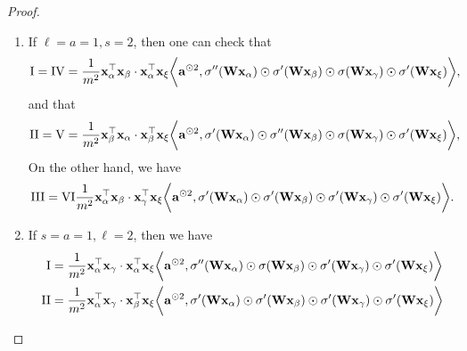 \begin{proof}
\begin{enumerate}[itemsep=0mm]
\begin{align*}
		\end{align*}
		Meanwhile, we have
		\begin{align*}
			\RN{2} & = (\nabla^2 f_\alpha)^{1jk}_{1uv} (\nabla^2 f_\beta)^{1jk}_{21 c} (\nabla f_\gamma)_{1uv} (\nabla f_\xi)_{21c} \\
			& = \frac{1}{m^2}\rvx_\alpha^\top\rvx_\beta \cdot\rvx_\alpha^\top\rvx_\gamma \bigg\la\rva^{\odot 2} , \sigma''(\rmW \rvx_\alpha) \odot \sigma'(\rmW \rvx_\beta) \odot \sigma'(\rmW \rvx_\gamma) \odot \sigma(\rmW \rvx_\xi) \bigg\ra \\
			& = \RN{1}.
		\end{align*}
		A similar calculation shows that $\RN{3} = \RN{2} = \RN{1}$. On the other hand, it's easy to check that
		\[
			\RN{4} = \RN{5} = \RN{6} = 
			\frac{1}{m^2}\rvx_\beta^\top\rvx_\alpha \cdot\rvx_\beta^\top\rvx_\gamma \bigg\la\rva^{\odot 2} , \sigma'(\rmW \rvx_\alpha) \odot \sigma''(\rmW \rvx_\beta) \odot \sigma'(\rmW \rvx_\gamma) \odot \sigma(\rmW \rvx_\xi) \bigg\ra.
		\]
		\item If $\ell = a = 1, s = 2$, then one can check that
		\[
			\RN{1} = \RN{4} = 
			\frac{1}{m^2}\rvx_\alpha^\top\rvx_\beta \cdot\rvx_\alpha^\top\rvx_\xi \bigg\la\rva^{\odot 2} , \sigma''(\rmW \rvx_\alpha) \odot \sigma'(\rmW \rvx_\beta) \odot \sigma(\rmW \rvx_\gamma) \odot \sigma'(\rmW \rvx_\xi) \bigg\ra,
		\]
		and that
		\[
			\RN{2} = \RN{5} = 
			\frac{1}{m^2}\rvx_\beta^\top\rvx_\alpha \cdot\rvx_\beta^\top\rvx_\xi \bigg\la\rva^{\odot 2} , \sigma'(\rmW \rvx_\alpha) \odot \sigma''(\rmW \rvx_\beta) \odot \sigma(\rmW \rvx_\gamma) \odot \sigma'(\rmW \rvx_\xi) \bigg\ra,
		\]
		On the other hand, we have
		\[
			\RN{3} = \RN{6}
			\frac{1}{m^2}\rvx_\alpha^\top\rvx_\beta \cdot\rvx_\gamma^\top\rvx_\xi \bigg\la\rva^{\odot 2} , \sigma'(\rmW \rvx_\alpha) \odot \sigma'(\rmW \rvx_\beta) \odot \sigma'(\rmW \rvx_\gamma) \odot \sigma'(\rmW \rvx_\xi) \bigg\ra.
		\]
		\item If $s = a = 1, \ell = 2$, then we have
		\begingroup
		\allowdisplaybreaks
		\begin{align*}
			\RN{1} & = 
			\frac{1}{m^2}\rvx_\alpha^\top\rvx_\gamma \cdot\rvx_\alpha^\top\rvx_\xi \bigg\la\rva^{\odot 2} , \sigma''(\rmW \rvx_\alpha) \odot \sigma(\rmW \rvx_\beta) \odot \sigma'(\rmW \rvx_\gamma) \odot \sigma'(\rmW \rvx_\xi) \bigg\ra \\
			\RN{2} & = 
			\frac{1}{m^2}\rvx_\alpha^\top\rvx_\gamma \cdot\rvx_\beta^\top\rvx_\xi \bigg\la\rva^{\odot 2} , \sigma'(\rmW \rvx_\alpha) \odot \sigma'(\rmW \rvx_\beta) \odot \sigma'(\rmW \rvx_\gamma) \odot \sigma'(\rmW \rvx_\xi) \bigg\ra \\ 

\end{align*}
\end{enumerate}
\end{proof}
